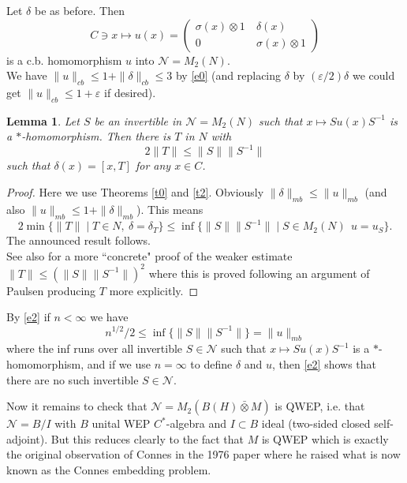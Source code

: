 \documentclass[11pt,leqno]{article}
\newcommand{\vp}{\varepsilon}
\newcommand{\cl}[1]{\mathcal{#1}}
\theoremstyle{plain}
\newtheorem{lem}[thm]{Lemma}
\theoremstyle{definition}
\theoremstyle{remark}
\numberwithin{equation}{section}
\def\d{\delta}
\def\d{\delta}
\begin{document}
         Let $\d$ be as before. Then
    $$C\ni x \mapsto u(x)=\left( \begin{matrix} \sigma(x)\otimes 1 & \ \d(x)\\ 0& \ \sigma(x)\otimes 1  \end{matrix}  \right)$$ 
    is a c.b. homomorphism $u$ into $\cl N=M_2( N)$. \\
    We have $\|u\|_{cb} \le 1 + \|\d\|_{cb} \le 3$ by \eqref{e0} (and replacing $\d$ by $(\vp/2)\d$ 
    we could get $\|u\|_{cb}\le 1+\vp$ if desired).
    
    
    \begin{lem} Let $S$ be an invertible in $\cl N=M_2( N)$ such that
    $x \mapsto S u(x) S^{-1}$ is a $*$-homomorphism. Then there is 
      $T$ in $N$ with
    $$2\|T\|  \le \|S\|\|S^{-1}\| $$ 
    such that $\d(x)=[x,T]$ for any $x\in C$.
   
    
    \end{lem}
    \begin{proof} Here we use Theorems  \ref{t0} and \ref{t2}.
    Obviously $\|\d\|_{mb} \le \|u\|_{mb}$ (and also $\|u\|_{mb}\le 1+\|\d\|_{mb}$). This means
    $$2\min\{ \|T\| \mid T\in N,\   \d=\d_T\}\le \inf \{  \|S\|\|S^{-1}\| \mid  S\in M_2(N)\ \  u=u_S\} .$$ 
         The announced result follows.\\
    See also \cite[p. 80]{95} for a more ``concrete" proof
    of the weaker estimate $\|T\|  \le (\|S\|\|S^{-1}\|)^2$
    where this is proved following
    an  argument of Paulsen producing $T$ more explicitly.
      \end{proof}

 
  

By \eqref{e2}  if $n<\infty$ we have
    \begin{equation}  \label{e14} n^{1/2} /2 \le  \inf \{\|S\|\|S^{-1}\| \}   =\|u\|_{mb}\end{equation}
    where the inf runs over all invertible $S\in \cl N$ such that
    $x \mapsto S u(x) S^{-1}$ is a $*$-homomorphism,
    and if we use $n=\infty$ to define $\d$ and $u$, then  \eqref{e2} shows that  there are no such invertible $S\in \cl N$. 
        
        Now it remains to check that
        $\cl N=M_2(B(H) \bar \otimes M)$    is QWEP, i.e.
        that $\cl N=B/I$ with $B$ unital WEP $C^*$-algebra and $I\subset B$ ideal (two-sided closed 
        self-adjoint). 
         But this reduces clearly to the fact that $M$ is QWEP
         which is  exactly the original observation of Connes
        in the 1976 paper where he raised what is now known 
        as the Connes embedding problem.
\end{document}
